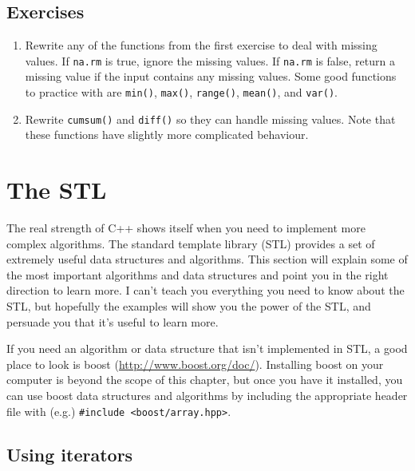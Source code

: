 \documentclass[]{book}
\renewcommand{\href}[2]{#2 (\url{#1})}
\begin{document}
\hypertarget{exercises-22}{%
\subsection{Exercises}\label{exercises-22}}

\begin{enumerate}
\def\labelenumi{\arabic{enumi}.}
\item
  Rewrite any of the functions from the first exercise to deal with missing
  values. If \texttt{na.rm} is true, ignore the missing values. If \texttt{na.rm} is false,
  return a missing value if the input contains any missing values. Some
  good functions to practice with are \texttt{min()}, \texttt{max()}, \texttt{range()}, \texttt{mean()},
  and \texttt{var()}.
\item
  Rewrite \texttt{cumsum()} and \texttt{diff()} so they can handle missing values. Note that
  these functions have slightly more complicated behaviour.
\end{enumerate}

\hypertarget{stl}{%
\section{The STL}\label{stl}}

The real strength of C++ shows itself when you need to implement more complex algorithms. The standard template library (STL) provides a set of extremely useful data structures and algorithms. This section will explain some of the most important algorithms and data structures and point you in the right direction to learn more. I can't teach you everything you need to know about the STL, but hopefully the examples will show you the power of the STL, and persuade you that it's useful to learn more. 

If you need an algorithm or data structure that isn't implemented in STL, a good place to look is \href{http://www.boost.org/doc/}{boost}. Installing boost on your computer is beyond the scope of this chapter, but once you have it installed, you can use boost data structures and algorithms by including the appropriate header file with (e.g.) \texttt{\#include\ \textless{}boost/array.hpp\textgreater{}}.

\hypertarget{using-iterators}{%
\subsection{Using iterators}\label{using-iterators}}
\end{document}

